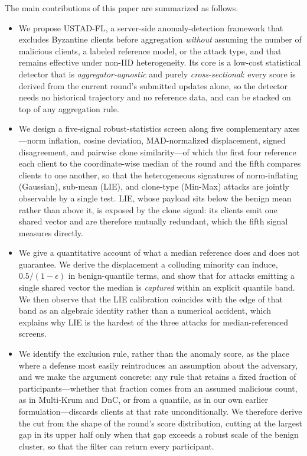 \documentclass[journal]{IEEEtran}
\begin{document}
The main contributions of this paper are summarized as follows.
\begin{itemize}
    \item We propose USTAD-FL, a server-side anomaly-detection framework that excludes Byzantine clients before aggregation \emph{without} assuming the number of malicious clients, a labeled reference model, or the attack type, and that remains effective under non-IID heterogeneity. Its core is a low-cost statistical detector that is \emph{aggregator-agnostic} and purely \emph{cross-sectional}: every score is derived from the current round's submitted updates alone, so the detector needs no historical trajectory and no reference data, and can be stacked on top of any aggregation rule.
    \item We design a five-signal robust-statistics screen along five complementary axes---norm inflation, cosine deviation, MAD-normalized displacement, signed disagreement, and pairwise clone similarity---of which the first four reference each client to the coordinate-wise median of the round and the fifth compares clients to one another, so that the heterogeneous signatures of norm-inflating (Gaussian), sub-mean (LIE), and clone-type (Min-Max) attacks are jointly observable by a single test. LIE, whose payload sits below the benign mean rather than above it, is exposed by the clone signal: its clients emit one shared vector and are therefore mutually redundant, which the fifth signal measures directly.
    \item We give a quantitative account of what a median reference does and does not guarantee. We derive the displacement a colluding minority can induce, $0.5/(1-\epsilon)$ in benign-quantile terms, and show that for attacks emitting a single shared vector the median is \emph{captured} within an explicit quantile band. We then observe that the LIE calibration coincides with the edge of that band as an algebraic identity rather than a numerical accident, which explains why LIE is the hardest of the three attacks for median-referenced screens.
    \item We identify the exclusion rule, rather than the anomaly score, as the place where a defense most easily reintroduces an assumption about the adversary, and we make the argument concrete: any rule that retains a fixed fraction of participants---whether that fraction comes from an assumed malicious count, as in Multi-Krum and DnC, or from a quantile, as in our own earlier formulation---discards clients at that rate unconditionally. We therefore derive the cut from the shape of the round's score distribution, cutting at the largest gap in its upper half only when that gap exceeds a robust scale of the benign cluster, so that the filter can return every participant.


\end{itemize}
\end{document}
